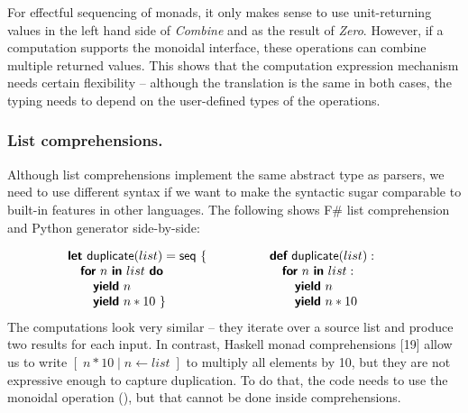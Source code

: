 \documentclass[runningheads,a4paper]{llncs}
\begin{document}
For effectful sequencing of monads, it only makes sense to use unit-returning values in the left hand
side of \emph{Combine} and as the result of \emph{Zero}. However, if a computation supports the monoidal
interface, these operations can combine multiple returned values. This shows that the computation 
expression mechanism needs certain flexibility -- although the translation is the same in both cases,
the typing needs to depend on the user-defined types of the operations.

\vspace{-1em}
\subsubsection{List comprehensions.} Although list comprehensions implement the same abstract type
as parsers, we need to use different syntax if we want to make the syntactic sugar comparable to 
built-in features in other languages. The following shows F\# list comprehension and Python generator
side-by-side:

\begin{equation*}
\hspace{-2em}
\begin{array}{l}
\kvd{let}~\ident{duplicate}(list) = \ident{seq}~\{\\
\quad \kvd{for}~n~\kvd{in}~list~\kvd{do}  \\
\quad\quad \kvd{yield}~n          \\
\quad\quad \kvd{yield}~n*10 ~\}
\end{array}
\qquad\qquad
\begin{array}{l}
\kvd{def}~\ident{duplicate}(list):\\
\quad \kvd{for}~n~\kvd{in}~list:  \\
\quad\quad \kvd{yield}~n          \\
\quad\quad \kvd{yield}~n*10
\end{array}
\end{equation*}
%
The computations look very similar -- they iterate over a source list and produce two results
for each input. In contrast, Haskell monad comprehensions [19] allow us to write $[\;n*10\;|\;n\leftarrow list\;]$
to multiply all elements by 10, but they are not expressive enough to capture duplication. To do 
that, the code needs to use the monoidal operation (), but that cannot be done
inside comprehensions.
\end{document}

